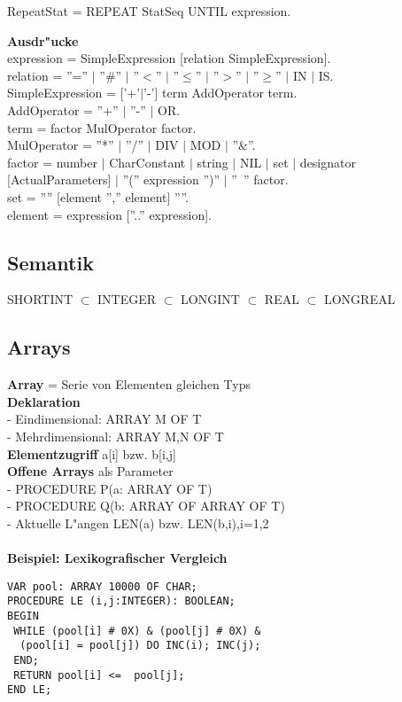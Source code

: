 \documentclass[10pt, a4paper, twocolumn]{scrartcl}
\begin{document}
\begin{description}
 RepeatStat = REPEAT StatSeq UNTIL expression.
 \item {\bf Ausdr"ucke}\\
 expression = SimpleExpression [relation SimpleExpression].\\
 relation = ''='' $|$ ''\#'' $|$ ''$<$'' $|$ ''$\leq$'' $|$ ''$>$'' $|$ ''$\geq$'' $|$ IN $|$ IS.\\
 SimpleExpression  =  ['+'$|$'-'] term {AddOperator term}.\\
 AddOperator  =  ''+'' $|$ ''-'' $|$ OR.\\
 term  =  factor {MulOperator factor}.\\
 MulOperator  =  ''*'' $|$ ''/'' $|$ DIV $|$ MOD $|$ ''\&''.\\
 factor  =  number $|$ CharConstant $|$ string $|$ NIL $|$ set $|$ designator [ActualParameters] $|$ ''('' expression '')'' $|$ ''~'' factor.\\
 set  =  ''{'' [element {'','' element}] ''}''.\\
 element  =  expression [''..'' expression].

\end{description}

\subsection{Semantik}
SHORTINT $\subset$ INTEGER $\subset$ LONGINT $\subset$ REAL $\subset$ LONGREAL

\subsection{Arrays}

{\bf Array} = Serie von Elementen gleichen Typs\\
{\bf Deklaration}\\
- Eindimensional: ARRAY M OF T\\
- Mehrdimensional: ARRAY M,N OF T\\
{\bf Elementzugriff} a[i] bzw. b[i,j]\\
{\bf Offene Arrays} als Parameter\\
- PROCEDURE P(a: ARRAY OF T)\\
- PROCEDURE Q(b: ARRAY OF ARRAY OF T)\\
- Aktuelle L"angen LEN(a) bzw. LEN(b,i),i=1,2\\\\

{\bf Beispiel: Lexikografischer Vergleich}
\begin{verbatim}
VAR pool: ARRAY 10000 OF CHAR;
PROCEDURE LE (i,j:INTEGER): BOOLEAN;
BEGIN
 WHILE (pool[i] # 0X) & (pool[j] # 0X) &
  (pool[i] = pool[j]) DO INC(i); INC(j);
 END;
 RETURN pool[i] <=  pool[j];
END LE;
\end{verbatim}
\end{document}
